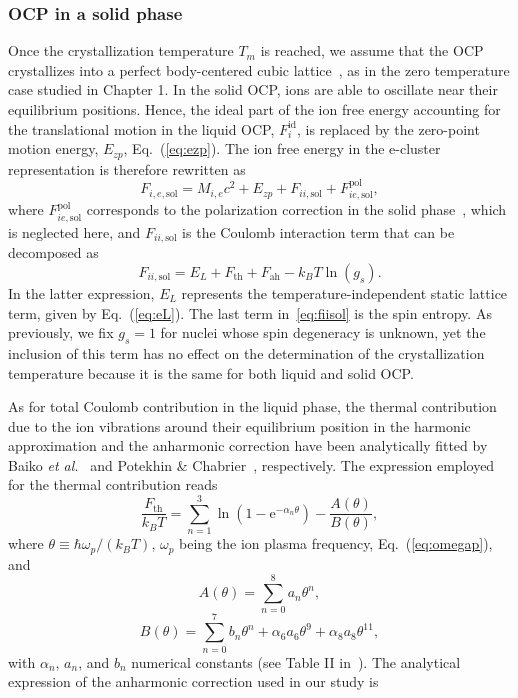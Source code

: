 \subsubsection{OCP in a solid phase}

Once the crystallization temperature $T_m$ is reached, we assume that the OCP 
crystallizes into a perfect body-centered cubic lattice~\cite{Chamel2016}, as
in the zero temperature case studied in Chapter 1. In the solid OCP, ions are
able to oscillate near their equilibrium positions. Hence, the ideal 
part of the ion free energy accounting for the translational motion in the 
liquid OCP, $F_{i}^{\text{id}}$, is replaced by the zero-point motion energy, 
$E_{zp}$, Eq.~(\ref{eq:ezp}). The ion free energy in the e-cluster
representation is therefore rewritten as
%
\begin{equation}
  F_{i,e,\text{sol}} = M_{i,e}c^2 + E_{zp} + F_{ii,\text{sol}} +
  F_{ie,\text{sol}}^{\text{pol}},
\end{equation}
%
where $F_{ie,\text{sol}}^{\text{pol}}$ corresponds to the polarization
correction in the solid phase~\cite{Potekhin2000}, which is neglected here, and
$F_{ii,\text{sol}}$ is the Coulomb interaction term that can be decomposed as
%
\begin{equation}
  F_{ii,\text{sol}} = E_L + F_{\text{th}} + F_{\text{ah}} - k_B
  T\ln(g_s).\label{eq:fiisol}
\end{equation}
%
In the latter expression, $E_L$ represents the temperature-independent static 
lattice term, given by Eq.~(\ref{eq:eL}). The last term in~\ref{eq:fiisol} is
the spin entropy. As previously, we fix $g_s=1$ for nuclei whose spin 
degeneracy is unknown, yet the inclusion of this term has no effect on the 
determination of the crystallization temperature because it is the same for 
both liquid and solid OCP.

As for total Coulomb contribution in the liquid phase, the thermal
contribution due to the ion vibrations around their equilibrium position in the 
harmonic approximation and the anharmonic correction have been analytically
fitted by Baiko \textit{et al.}~\cite{Baiko2001} and Potekhin \&
Chabrier~\cite{Potekhin2010}, respectively. 
The expression employed for the thermal contribution reads~\cite{Baiko2001}
%
\begin{equation}
  \frac{F_{\text{th}}}{k_B T} = \sum_{n=1}^3\ln\left(1
    -\text{e}^{-\alpha_n\theta}\right) 
  - \frac{A(\theta)}{B(\theta)},
\end{equation}
%
where $\theta \equiv \hbar\omega_p/(k_B T)$, $\omega_p$ being the ion plasma
frequency, Eq.~(\ref{eq:omegap}), and
%
\begin{equation}
  A(\theta) = \sum_{n=0}^{8}a_n\theta^n,
\end{equation}
%
\begin{equation}
  B(\theta) = \sum_{n=0}^{7}b_n\theta^n 
  + \alpha_6 a_6 \theta^9 
  + \alpha_8 a_8 \theta^{11},
\end{equation}
%
with $\alpha_n$, $a_n$, and $b_n$ numerical constants (see Table II
in~\cite{Baiko2001}).
The analytical expression of the anharmonic correction used in our study
is~\cite{Potekhin2010}

